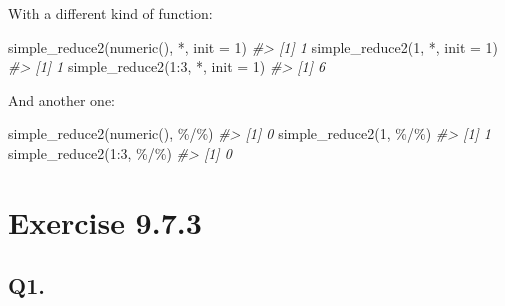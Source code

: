 \documentclass[
]{book}
\newenvironment{Shaded}{\begin{snugshade}}{\end{snugshade}}
\newcommand{\AttributeTok}[1]{\textcolor[rgb]{0.77,0.63,0.00}{#1}}
\newcommand{\CommentTok}[1]{\textcolor[rgb]{0.56,0.35,0.01}{\textit{#1}}}
\newcommand{\DecValTok}[1]{\textcolor[rgb]{0.00,0.00,0.81}{#1}}
\newcommand{\FunctionTok}[1]{\textcolor[rgb]{0.00,0.00,0.00}{#1}}
\newcommand{\NormalTok}[1]{#1}
\newcommand{\SpecialCharTok}[1]{\textcolor[rgb]{0.00,0.00,0.00}{#1}}
\newcommand{\StringTok}[1]{\textcolor[rgb]{0.31,0.60,0.02}{#1}}
\begin{document}
With a different kind of function:

\begin{Shaded}
\begin{Highlighting}[]
\FunctionTok{simple\_reduce2}\NormalTok{(}\FunctionTok{numeric}\NormalTok{(), }\StringTok{\textasciigrave{}}\AttributeTok{*}\StringTok{\textasciigrave{}}\NormalTok{, }\AttributeTok{init =} \DecValTok{1}\NormalTok{)}
\CommentTok{\#\textgreater{} [1] 1}
\FunctionTok{simple\_reduce2}\NormalTok{(}\DecValTok{1}\NormalTok{, }\StringTok{\textasciigrave{}}\AttributeTok{*}\StringTok{\textasciigrave{}}\NormalTok{, }\AttributeTok{init =} \DecValTok{1}\NormalTok{)}
\CommentTok{\#\textgreater{} [1] 1}
\FunctionTok{simple\_reduce2}\NormalTok{(}\DecValTok{1}\SpecialCharTok{:}\DecValTok{3}\NormalTok{, }\StringTok{\textasciigrave{}}\AttributeTok{*}\StringTok{\textasciigrave{}}\NormalTok{, }\AttributeTok{init =} \DecValTok{1}\NormalTok{)}
\CommentTok{\#\textgreater{} [1] 6}
\end{Highlighting}
\end{Shaded}

And another one:

\begin{Shaded}
\begin{Highlighting}[]
\FunctionTok{simple\_reduce2}\NormalTok{(}\FunctionTok{numeric}\NormalTok{(), }\StringTok{\textasciigrave{}}\AttributeTok{\%/\%}\StringTok{\textasciigrave{}}\NormalTok{)}
\CommentTok{\#\textgreater{} [1] 0}
\FunctionTok{simple\_reduce2}\NormalTok{(}\DecValTok{1}\NormalTok{, }\StringTok{\textasciigrave{}}\AttributeTok{\%/\%}\StringTok{\textasciigrave{}}\NormalTok{)}
\CommentTok{\#\textgreater{} [1] 1}
\FunctionTok{simple\_reduce2}\NormalTok{(}\DecValTok{1}\SpecialCharTok{:}\DecValTok{3}\NormalTok{, }\StringTok{\textasciigrave{}}\AttributeTok{\%/\%}\StringTok{\textasciigrave{}}\NormalTok{)}
\CommentTok{\#\textgreater{} [1] 0}
\end{Highlighting}
\end{Shaded}

\hypertarget{exercise-9.7.3}{%
\section{Exercise 9.7.3}\label{exercise-9.7.3}}

\hypertarget{q1.}{%
\subsection*{Q1.}\label{q1.}}
\end{document}
